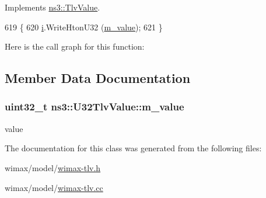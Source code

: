 Implements \hyperlink{classns3_1_1TlvValue_aeec8825728398e18337efd9cb40a2aa4}{ns3\+::\+Tlv\+Value}.


\begin{DoxyCode}
619 \{
620   \hyperlink{bernuolliDistribution_8m_a6f6ccfcf58b31cb6412107d9d5281426}{i}.WriteHtonU32 (\hyperlink{classns3_1_1U32TlvValue_aebac142209cfad0816ea737d1533dca4}{m\_value});
621 \}
\end{DoxyCode}


Here is the call graph for this function\+:




\subsection{Member Data Documentation}
\subsubsection[{\texorpdfstring{m\+\_\+value}{m_value}}]{\setlength{\rightskip}{0pt plus 5cm}uint32\+\_\+t ns3\+::\+U32\+Tlv\+Value\+::m\+\_\+value\hspace{0.3cm}{\ttfamily [private]}}\hypertarget{classns3_1_1U32TlvValue_aebac142209cfad0816ea737d1533dca4}{}\label{classns3_1_1U32TlvValue_aebac142209cfad0816ea737d1533dca4}


value 



The documentation for this class was generated from the following files\+:\begin{DoxyCompactItemize}
\item 
wimax/model/\hyperlink{wimax-tlv_8h}{wimax-\/tlv.\+h}\item 
wimax/model/\hyperlink{wimax-tlv_8cc}{wimax-\/tlv.\+cc}\end{DoxyCompactItemize}
